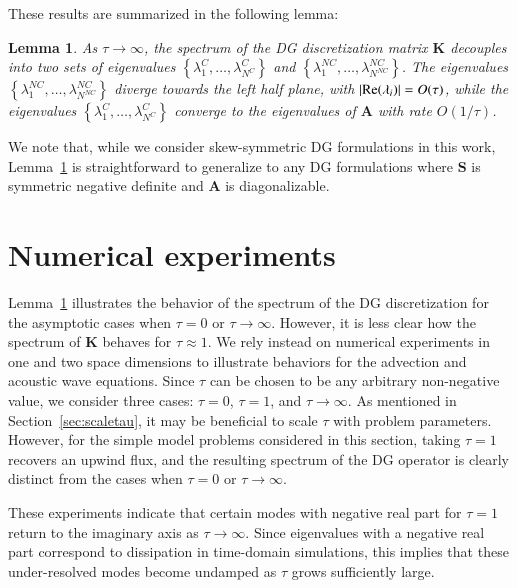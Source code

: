 \documentclass[preprint,10pt]{elsarticle}
\newcommand{\LRb}[1]{\left| #1 \right|}
\newcommand{\LRc}[1]{\left\{ #1 \right\}}
\newtheorem{lemma}[theorem]{Lemma}
\newcommand{\note}[1]{{\color{blue}#1}}
\begin{document}
These results are summarized in the following lemma:
\begin{lemma}
As $\tau \rightarrow \infty$, the spectrum of the DG discretization matrix $\bm{K}$ decouples into two sets of eigenvalues $\LRc{\lambda^C_1,\ldots,\lambda^C_{N^C}}$ and $\LRc{\lambda^{NC}_1,\ldots,\lambda^{NC}_{N^{NC}}}$.  The eigenvalues $\LRc{\lambda^{NC}_1,\ldots,\lambda^{NC}_{N^{NC}}}$ diverge towards the left half plane, with $\LRb{{\rm Re}(\lambda_i)} = O(\tau)$, while  the eigenvalues $\LRc{\lambda^C_1,\ldots,\lambda^C_{N^C}}$ converge to the eigenvalues of $\bm{A}$ with rate $O(1/\tau)$.  
\label{lemma:eig}
\end{lemma}
We note that, while we consider skew-symmetric DG formulations in this work, Lemma~\ref{lemma:eig} is straightforward to generalize to any DG formulations where $\bm{S}$ is symmetric negative definite and $\bm{A}$ is diagonalizable.%


\section{Numerical experiments}

Lemma~\ref{lemma:eig} illustrates the behavior of the \note{spectrum} of the DG discretization for the asymptotic cases when $\tau = 0$ or $\tau \rightarrow \infty$.  However, it is less clear how the \note{spectrum} of $\bm{K}$ behaves for $\tau \approx 1$.  We rely instead on numerical experiments in one and two space dimensions to illustrate behaviors for the advection and acoustic wave equations.  {\note{Since $\tau$ can be chosen to be any arbitrary non-negative value, we consider three cases: $\tau = 0$, $\tau = 1$, and $\tau \rightarrow \infty$.  As mentioned in Section~\ref{sec:scaletau}, it may be beneficial to scale $\tau$ with problem parameters.  However, for the simple model problems considered in this section, taking $\tau = 1$ recovers an upwind flux, and the resulting spectrum of the DG operator is clearly distinct from the cases when $\tau = 0$ or $\tau \rightarrow \infty$.}  }

These experiments indicate that certain modes with negative real part for $\tau = 1$ return to the imaginary axis as $\tau \rightarrow \infty$.  Since eigenvalues with a negative real part correspond to dissipation in time-domain simulations, this implies that these under-resolved modes become undamped as $\tau$ grows sufficiently large.  
\end{document}
